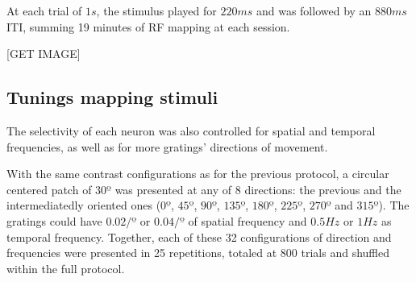At each trial of $1 s$, the stimulus played for $220 ms$ and was followed by an $880ms$ ITI, summing 19 minutes of RF mapping at each session. 

[GET IMAGE]

 \begin{table}[H]
\begin{center}\par
{}
 \caption{Configurations regarding the RF mapping protocol stimuli properties.}
    \vspace{-5mm}
    \label{table:RF}
\end{center}
\end{table}

\subsection{Tunings mapping stimuli}
\label{subsec:subbsectionC}

The selectivity of each neuron was also controlled for spatial and temporal frequencies, as well as for more gratings' directions of movement. 

With the same contrast configurations as for the previous protocol, a circular centered patch of $30º$ was presented at any of 8 directions: the previous and the intermediatedly oriented ones ($0º$, $45º$, $90º$, $135º$, $180º$, $225º$, $270º$ and $315º$). The gratings could have $0.02 /º$ or $0.04 /º$ of spatial frequency and $0.5 Hz$ or $1 Hz$ as temporal frequency. Together, each of these 32 configurations of direction and frequencies were presented in 25 repetitions, totaled at 800 trials and shuffled within the full protocol.

